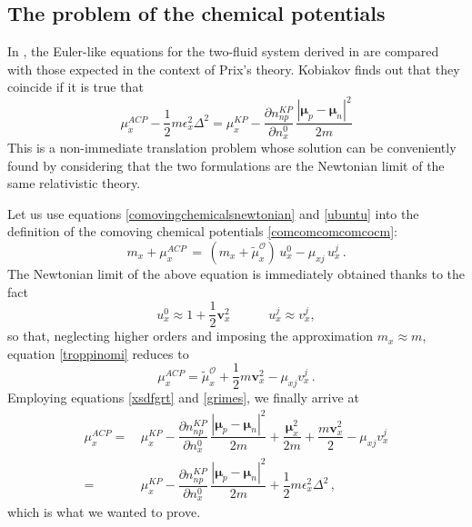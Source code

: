 \documentclass[usenatbib]{mnras}
\newcommand{\vect}[1]{\mathbf{{#1}}}
\newcommand{\spc}{\quad \quad \quad}
\begin{document}
\subsection{The problem of the chemical potentials}

In \cite{koby2018PhRvC}, the  Euler-like equations for the two-fluid system  derived in \cite{KP2017} are compared with those expected in the context of Prix's theory. Kobiakov finds out that they coincide if it is true that
%
\begin{equation}
\mu_x^{ACP} -\dfrac{1}{2} m \epsilon_x^2 \Delta^2 = \mu_x^{KP} -  \dfrac{\partial n_{np}^{KP}}{\partial n_x^0} \,
\dfrac{|\boldsymbol{\mu}_p - \boldsymbol{\mu}_n|^2 }{2m}
\end{equation}
%
This is a non-immediate translation problem whose solution can be conveniently found by considering that the two formulations are the Newtonian limit of the same relativistic theory.

Let us use equations \eqref{comovingchemicalsnewtonian} and \eqref{ubuntu} into the definition of the comoving chemical potentials \eqref{comcomcomcomcocm}:
% 
\begin{equation}
\label{troppinomi}
m_x + \mu_x^{ACP} \, = \, (  m_x+ \tilde{\mu}_x^{\mathcal{O}}  )\,  u_x^0 - \mu_{xj} \, u_x^j \, .
\end{equation}
%
The Newtonian limit of the above equation is immediately obtained thanks to the fact
%
\begin{equation}
u_x^0 \approx 1 + \dfrac{1}{2} \vect{v}_x^2  \spc u_x^j \approx v_x^j,
\end{equation}
%
so that, neglecting higher orders and imposing the approximation $m_x \approx m$, equation \eqref{troppinomi} reduces to
%
\begin{equation}
\label{ululatoauuuu!}
\mu_x^{ACP} =  \tilde{\mu}_x^{\mathcal{O}} + \dfrac{1}{2} m \vect{v}_x^2 - \mu_{xj}v_x^j \, .
\end{equation}
%
Employing equations \eqref{xsdfgrt} and \eqref{grimes}, we finally arrive at
%
\begin{align}
\nonumber
\mu_x^{ACP} 
= & \,
\mu_x^{KP}- \dfrac{\partial n_{np}^{KP}}{\partial n_x^0} \,
\dfrac{|\boldsymbol{\mu}_p - \boldsymbol{\mu}_n|^2 }{2m} +
\dfrac{\boldsymbol{\mu}_x^2}{2m}  + \dfrac{m \vect{v}_x^2}{2}  - \mu_{xj}v_x^j 
\\ 
= &
\, \mu_x^{KP}-  \dfrac{\partial n_{np}^{KP}}{\partial n_x^0} \,
\dfrac{|\boldsymbol{\mu}_p - \boldsymbol{\mu}_n|^2 }{2m}
+\dfrac{1}{2} m \epsilon_x^2 \Delta^2 \, ,
\end{align}
%
which is what we wanted to prove.
\end{document}
